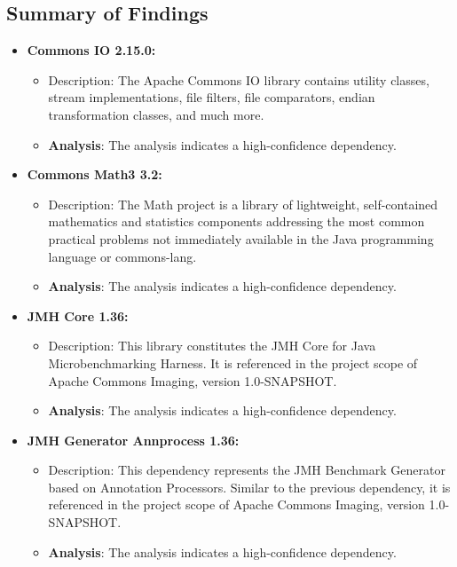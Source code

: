 \documentclass[sigconf]{acmart}
\begin{document}
\subsection{Summary of Findings}

\begin{itemize}
    \item \textbf{Commons IO 2.15.0:}
        \begin{itemize}
            \item Description: The Apache Commons IO library contains utility classes, stream implementations, file filters, file comparators, endian transformation classes, and much more.
            \item \textbf{Analysis}: The analysis indicates a high-confidence dependency.
        \end{itemize}
    
    \item \textbf{Commons Math3 3.2:}
        \begin{itemize}
            \item Description: The Math project is a library of lightweight, self-contained mathematics and statistics components addressing the most common practical problems not immediately available in the Java programming language or commons-lang.
            \item \textbf{Analysis}: The analysis indicates a high-confidence dependency.
        \end{itemize}
    
    \item \textbf{JMH Core 1.36:}
        \begin{itemize}
            \item Description: This library constitutes the JMH Core for Java Microbenchmarking Harness. It is referenced in the project scope of Apache Commons Imaging, version 1.0-SNAPSHOT.
            \item \textbf{Analysis}: The analysis indicates a high-confidence dependency.
        \end{itemize}
    
    \item \textbf{JMH Generator Annprocess 1.36:}
        \begin{itemize}
            \item Description: This dependency represents the JMH Benchmark Generator based on Annotation Processors. Similar to the previous dependency, it is referenced in the project scope of Apache Commons Imaging, version 1.0-SNAPSHOT.
            \item \textbf{Analysis}: The analysis indicates a high-confidence dependency.
        \end{itemize}
    

\end{itemize}
\end{document}
